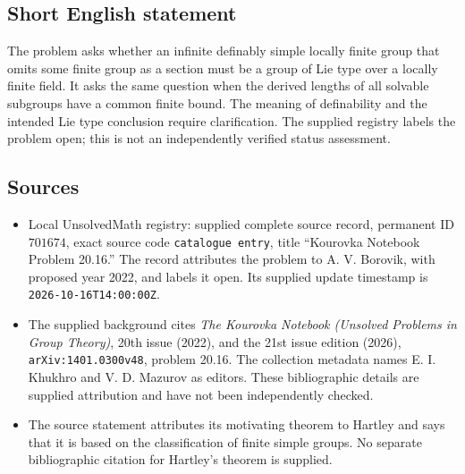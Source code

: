 \documentclass[11pt]{article}
\begin{document}
\subsection{Short English statement}
The problem asks whether an infinite definably simple locally finite group that omits some finite group as a section must be a group of Lie type over a locally finite field. It asks the same question when the derived lengths of all solvable subgroups have a common finite bound. The meaning of definability and the intended Lie type conclusion require clarification. The supplied registry labels the problem open; this is not an independently verified status assessment.
\subsection{Sources}
\begin{itemize}
\item Local UnsolvedMath registry: supplied complete source record, permanent ID \(701674\), exact source code \texttt{catalogue entry}, title ``Kourovka Notebook Problem 20.16.'' The record attributes the problem to A. V. Borovik, with proposed year 2022, and labels it open. Its supplied update timestamp is \texttt{2026-10-16T14:00:00Z}.
\item The supplied background cites \emph{The Kourovka Notebook (Unsolved Problems in Group Theory)}, 20th issue (2022), and the 21st issue edition (2026), \texttt{arXiv:1401.0300v48}, problem 20.16. The collection metadata names E. I. Khukhro and V. D. Mazurov as editors. These bibliographic details are supplied attribution and have not been independently checked.
\item The source statement attributes its motivating theorem to Hartley and says that it is based on the classification of finite simple groups. No separate bibliographic citation for Hartley's theorem is supplied.
\end{itemize}
\end{document}
